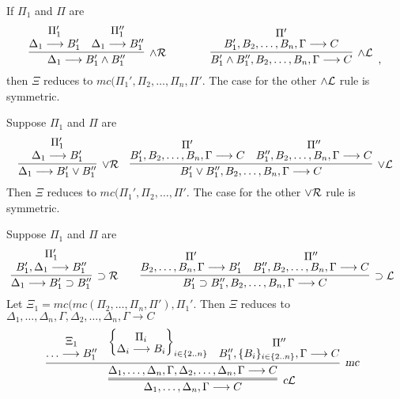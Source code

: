 \documentclass[preprint]{elsarticle}
\newcommand{\Seq}[2]{#1\longrightarrow #2}
\newcommand{\cL}{\hbox{\sl c}{\cal L}}
\newcommand{\landL}{\land{\cal L}}
\newcommand{\landR}{\land{\cal R}}
\newcommand{\lorL}{\lor{\cal L}}
\newcommand{\lorR}{\lor{\cal R}}
\newcommand{\mc}{\hbox{\sl mc}}
\newcommand{\oimpL}{\oimp{\cal L}}
\newcommand{\oimpR}{\oimp{\cal R}}
\newcommand{\oimp}{\supset}
\newlength{\infwidthi}
\begin{document}
\begin{trivlist}
  \item[\fbox{$\landR/\landL$}] If $\Pi_1$ and $\Pi$ are
    \begin{displaymath}
      \infer[\landR]{\Seq{\Delta_1}{B_1' \land B_1''}}
      {\deduce{\Seq{\Delta_1}{B_1'}}
        {\Pi_1'}
	& \deduce{\Seq{\Delta_1}{B_1''}}
        {\Pi_1''}}
      \qquad\qquad
      \infer[\landL]{\Seq{B_1' \land B_1'',B_2,\ldots,B_n,\Gamma}{C}}
      {\deduce{\Seq{B_1',B_2,\ldots,B_n,\Gamma}{C}}
        {\Pi'}}
      \enspace ,
    \end{displaymath}
    then $\Xi$ reduces to $mc(\Pi_1',\Pi_2,\ldots,\Pi_n,\Pi'$.
    The case for the other $\landL$ rule is symmetric.



  \item[\fbox{$\lorR/\lorL$}] Suppose $\Pi_1$ and $\Pi$ are
    \begin{displaymath}
      \infer[\lorR]{\Seq{\Delta_1}{B_1' \lor B_1''}}
      {\deduce{\Seq{\Delta_1}{B_1'}}
        {\Pi_1'}}
      \quad
      \infer[\lorL]{\Seq{B_1' \lor B_1'',B_2,\ldots,B_n,\Gamma}{C}}
      {\deduce{\Seq{B_1',B_2,\ldots,B_n,\Gamma}{C}}
        {\Pi'}
	& \deduce{\Seq{B_1'',B_2,\ldots,B_n,\Gamma}{C}}
        {\Pi''}}      
    \end{displaymath}
    Then $\Xi$ reduces to $mc(\Pi_1',\Pi_2,\ldots,\Pi'$.
    The case for the other $\lorR$ rule is symmetric.



  \item[\fbox{$\oimpR/\oimpL$}] Suppose $\Pi_1$ and $\Pi$ are
    \begin{displaymath}
      \infer[\oimpR]{\Seq{\Delta_1}{B_1' \oimp B_1''}}
      {\deduce{\Seq{B_1',\Delta_1}{B_1''}}
        {\Pi_1'}}
      \qquad
      \infer[\oimpL]{\Seq{B_1' \oimp B_1'',B_2,\ldots,B_n,\Gamma}{C}}
      {\deduce{\Seq{B_2,\ldots,B_n,\Gamma}{B_1'}}
        {\Pi'}
	& \deduce{\Seq{B_1'',B_2,\ldots,B_n,\Gamma}{C}}
        {\Pi''}}
      \enspace 
    \end{displaymath}
    Let $\Xi_1 = mc(mc(\Pi_2,\ldots,\Pi_n,\Pi'),\Pi_1'$. 
Then $\Xi$ reduces to \settowidth{\infwidthi}
    {$\Seq{\Delta_1,\ldots,\Delta_n,\Gamma,\Delta_2,\ldots,\Delta_n,\Gamma}{C}$}
    \begin{displaymath}
      \infer=[\cL]
      {\Seq{\Delta_1,\ldots,\Delta_n,\Gamma}{C}}
      {
        \infer[\mc]
        {\Seq{\Delta_1,\ldots,\Delta_n,\Gamma, \Delta_2,\ldots,\Delta_n,\Gamma}{C}}
        {
          \raisebox{-2.5ex}{\deduce{\Seq{\ldots}{B_1''}}{\Xi_1}}
          & 
          \left\{\raisebox{-1.5ex}{\deduce{\Seq{\Delta_i}{B_i}}{\Pi_i}}\right\}_{i \in \{2..n\}}
          & \raisebox{-2.5ex}{\deduce{\Seq{B_1'',\{B_i\}_{i \in \{2..n\}},\Gamma}{C}}{\Pi''}}
        }
      }
      \enspace 
    \end{displaymath}


\end{trivlist}
\end{document}
